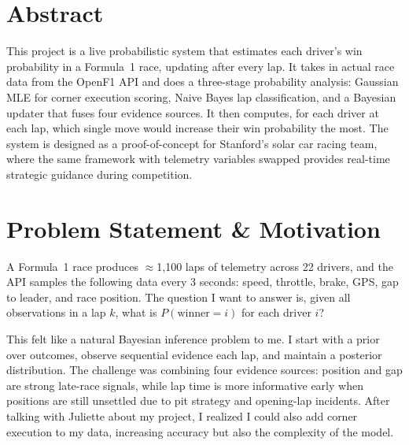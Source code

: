 \documentclass[10pt,twocolumn]{article}
\begin{document}

\section{Abstract}

This project is a live probabilistic system that estimates each driver's win
probability in a Formula~1 race, updating after every lap. It takes in actual race data
from the OpenF1 API and does a three-stage probability analysis: Gaussian MLE for
corner execution scoring, Naive Bayes lap classification, and a
Bayesian updater that fuses four evidence sources. It then computes,
for each driver at each lap, which single move would increase their win probability the most. The system is
designed as a proof-of-concept for Stanford's solar car racing team, where the
same framework with telemetry variables swapped provides real-time strategic
guidance during competition.

\section{Problem Statement \& Motivation}

A Formula~1 race produces $\approx$1,100 laps of telemetry across 22 drivers,
and the API samples the following data every 3 seconds: speed, throttle, brake, GPS, gap to leader, and race
position. The question I want to answer is, given all observations in a lap $k$, what is
$P(\text{winner} = i)$ for each driver $i$?

This felt like a natural Bayesian inference problem to me. I start with a prior over
outcomes, observe sequential evidence each lap, and maintain a posterior
distribution. The challenge was combining four evidence sources:
position and gap are strong late-race signals, while lap
time is more informative early when positions are still unsettled due to pit
strategy and opening-lap incidents. After talking with Juliette about my project,
I realized I could also add corner execution to my data, increasing accuracy but also
the complexity of the model.
\end{document}
